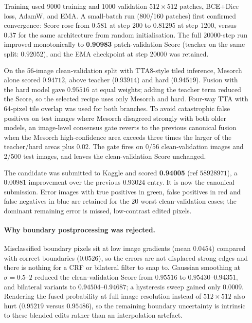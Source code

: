\documentclass[10pt]{article}
\begin{document}
Training used 9000 training and 1000 validation $512\times512$ patches, BCE+Dice loss, AdamW, and EMA. A small-batch run (800/160 patches) first confirmed convergence: Score rose from $0.581$ at step 200 to $0.81295$ at step 1200, versus $0.37$ for the same architecture from random initialisation. The full 20000-step run improved monotonically to \textbf{0.90983} patch-validation Score (teacher on the same split: $0.92052$), and the EMA checkpoint at step 20000 was retained.

On the 56-image clean-validation split with TTA8-style tiled inference, Mesorch alone scored $0.94712$, above teacher ($0.93914$) and hard ($0.94519$). Fusion with the hard model gave $0.95516$ at equal weights; adding the teacher term reduced the Score, so the selected recipe uses only Mesorch and hard. Four-way TTA with 64-pixel tile overlap was used for both branches. To avoid catastrophic false positives on test images where Mesorch disagreed strongly with both older models, an image-level consensus gate reverts to the previous canonical fusion when the Mesorch high-confidence area exceeds three times the larger of the teacher/hard areas plus $0.02$. The gate fires on 0/56 clean-validation images and 2/500 test images, and leaves the clean-validation Score unchanged.

The candidate was submitted to Kaggle and scored \textbf{0.94005} (ref $58928971$), a $0.00981$ improvement over the previous $0.93024$ entry. It is now the canonical submission. Error images with true positives in green, false positives in red and false negatives in blue are retained for the 20 worst clean-validation cases; the dominant remaining error is missed, low-contrast edited pixels.

\paragraph{Why boundary postprocessing was rejected.} Misclassified boundary pixels sit at low image gradients (mean $0.0454$) compared with correct boundaries ($0.0526$), so the errors are not displaced strong edges and there is nothing for a CRF or bilateral filter to snap to. Gaussian smoothing at $\sigma=0.5$--$2$ reduced the clean-validation Score from $0.95516$ to $0.95430$--$0.94351$, and bilateral variants to $0.94504$--$0.94687$; a hysteresis sweep gained only $0.0009$. Rendering the fused probability at full image resolution instead of $512\times512$ also hurt ($0.95219$ versus $0.95486$), so the remaining boundary uncertainty is intrinsic to these blended edits rather than an interpolation artefact.
\end{document}
